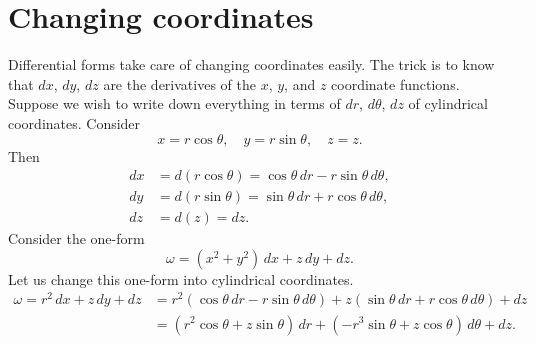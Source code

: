 \documentclass[12pt]{article}
\begin{document}
%
%

\section*{Changing coordinates}

Differential forms take care of changing coordinates easily.  The trick is
to know that $dx$, $dy$, $dz$ are the derivatives of the $x$, $y$, and $z$ coordinate
functions.  Suppose we wish to write down everything in terms of $dr$, $d\theta$, $dz$ of cylindrical coordinates.
Consider
\[
x = r \cos \theta, \quad y = r \sin \theta, \quad z = z .
\]
Then
\begin{align*}
dx & = d(r \cos \theta) = \cos \theta \, dr - r \sin \theta \, d \theta , \\
dy & = d(r \sin \theta) = \sin \theta \, dr + r \cos \theta \, d \theta , \\
dz & = d(z) = dz .
\end{align*}
Consider the one-form
\[
\omega = (x^2+y^2) \, dx + z \, dy + dz .
\]
Let us change this one-form into cylindrical coordinates.
\begin{equation*}
\begin{split}
\omega = 
r^2 \, dx + z \, dy + dz
& =
r^2 (\cos \theta \, dr - r \sin \theta \, d \theta)
+ z (\sin \theta \, dr + r \cos \theta \, d \theta)
+ dz
\\
& =
( r^2 \cos \theta + z \sin \theta) \, dr
+ (- r^3 \sin \theta + z \cos \theta ) \, d\theta
+ dz .
\end{split}
\end{equation*}
\end{document}
